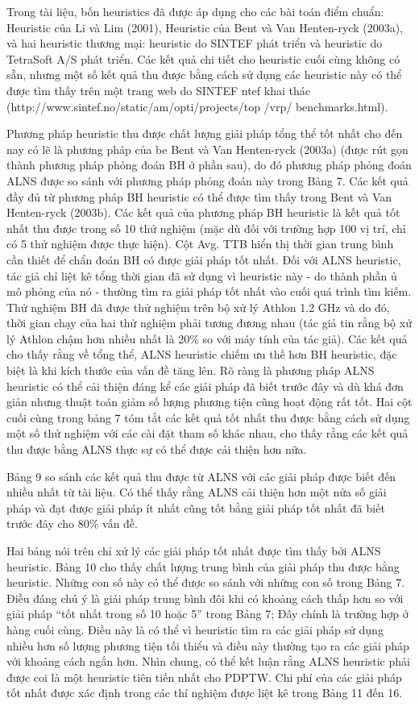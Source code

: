 Trong tài liệu, bốn heuristics đã được áp dụng cho các bài toán điểm chuẩn: Heuristic của Li và Lim (2001), Heuristic của Bent và Van Henten-ryck (2003a), và hai heuristic thương mại: heuristic do SINTEF phát triển và heuristic do TetraSoft A/S phát triển. Các kết quả chi tiết cho heuristic cuối cùng không có sẵn, nhưng một số kết quả thu được bằng cách sử dụng các heuristic này có thể được tìm thấy trên một trang web do SINTEF ntef khai thác (http://www.sintef.no/static/am/opti/projects/top /vrp/ benchmarks.html).

Phương pháp heuristic thu được chất lượng giải pháp tổng thể tốt nhất cho đến nay có lẽ là phương pháp của be Bent và Van Henten-ryck (2003a) (được rút gọn thành phương pháp phỏng đoán BH ở phần sau), do đó phương pháp phỏng đoán ALNS được so sánh với phương pháp phỏng đoán này trong Bảng 7. Các kết quả đầy đủ từ phương pháp BH heuristic có thể được tìm thấy trong Bent và Van Henten-ryck (2003b). Các kết quả của phương pháp BH heuristic là kết quả tốt nhất thu được trong số 10 thử nghiệm (mặc dù đối với trường hợp 100 vị trí, chỉ có 5 thử nghiệm được thực hiện). Cột Avg. TTB hiển thị thời gian trung bình cần thiết để chẩn đoán BH có được giải pháp tốt nhất. Đối với ALNS heuristic, tác giả chỉ liệt kê tổng thời gian đã sử dụng vì heuristic này - do thành phần ủ mô phỏng của nó - thường tìm ra giải pháp tốt nhất vào cuối quá trình tìm kiếm. Thử nghiệm BH đã được thử nghiệm trên bộ xử lý Athlon 1.2 GHz và do đó, thời gian chạy của hai thử nghiệm phải tương đương nhau (tác giả tin rằng bộ xử lý Athlon chậm hơn nhiều nhất là 20\% so với máy tính của tác giả). Các kết quả cho thấy rằng về tổng thể, ALNS heuristic chiếm ưu thế hơn BH heuristic, đặc biệt là khi kích thước của vấn đề tăng lên. Rõ ràng là phương pháp ALNS heuristic có thể cải thiện đáng kể các giải pháp đã biết trước đây và dù khá đơn giản nhưng thuật toán giảm số lượng phương tiện cũng hoạt động rất tốt. Hai cột cuối cùng trong bảng 7 tóm tắt các kết quả tốt nhất thu được bằng cách sử dụng một số thử nghiệm với các cài đặt tham số khác nhau, cho thấy rằng các kết quả thu được bằng ALNS thực sự có thể được cải thiện hơn nữa.

Bảng 9 so sánh các kết quả thu được từ ALNS với các giải pháp được biết đến nhiều nhất từ tài liệu. Có thể thấy rằng ALNS cải thiện hơn một nửa số giải pháp và đạt được giải pháp ít nhất cũng tốt bằng giải pháp tốt nhất đã biết trước đây cho 80\% vấn đề.

Hai bảng nói trên chỉ xử lý các giải pháp tốt nhất được tìm thấy bởi ALNS heuristic. Bảng 10 cho thấy chất lượng trung bình của giải pháp thu được bằng heuristic. Những con số này có thể được so sánh với những con số trong Bảng 7. Điều đáng chú ý là giải pháp trung bình đôi khi có khoảng cách thấp hơn so với giải pháp “tốt nhất trong số 10 hoặc 5” trong Bảng 7; Đây chính là trường hợp ở hàng cuối cùng. Điều này là có thể vì heuristic tìm ra các giải pháp sử dụng nhiều hơn số lượng phương tiện tối thiểu và điều này thường tạo ra các giải pháp với khoảng cách ngắn hơn.
Nhìn chung, có thể kết luận rằng ALNS heuristic phải được coi là một heuristic tiên tiến nhất cho PDPTW. Chi phí của các giải pháp tốt nhất được xác định trong các thí nghiệm được liệt kê trong Bảng 11 đến 16.

